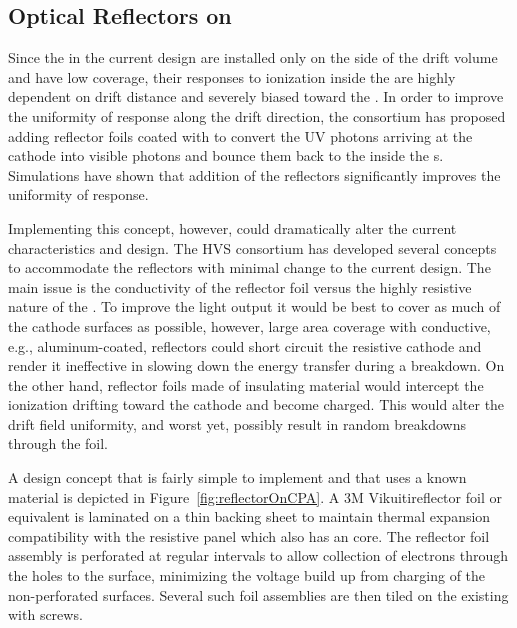 \subsection{Optical Reflectors on }

Since the  in the current  design are installed only on the  side of the drift volume and have low coverage, their responses to ionization inside the  are highly dependent on drift distance and severely biased toward the .  In order to improve the uniformity of response along the drift direction, the  consortium has proposed adding reflector foils coated with  to convert the UV photons arriving at the cathode into visible photons and bounce them back to the  inside the s.  Simulations have shown that addition of the reflectors  significantly improves the uniformity of response.

Implementing this concept, however, could dramatically alter the current  characteristics and design.  The HVS consortium has %
developed several concepts to accommodate the reflectors with minimal change to the current  design.  The main issue %
is the conductivity of the reflector foil versus the highly resistive nature of the .  To improve the light output it would be best to %
cover as much of the cathode surfaces as possible, however, %
large area coverage with conductive, e.g., aluminum-coated, reflectors could short circuit the resistive cathode and render it ineffective in slowing down the energy transfer during a  breakdown.  On the other hand, %
reflector foils made of insulating material would intercept the ionization drifting toward the cathode and become charged. This would alter the drift field uniformity, and worst yet, possibly result in random breakdowns through the foil.

A design concept that is fairly simple to implement and that uses a known material is depicted in Figure~\ref{fig:reflectorOnCPA}.  A 3M Vikuiti\texttrademark  reflector foil  or equivalent is laminated on a thin \frfour backing sheet to maintain thermal expansion compatibility
with the resistive  panel which also has an \frfour core. The reflector foil assembly is perforated at regular intervals to allow %
collection of electrons through the holes to the   surface, minimizing the voltage build up from charging of the non-perforated surfaces.  Several such foil assemblies are then tiled on the existing  with screws.

